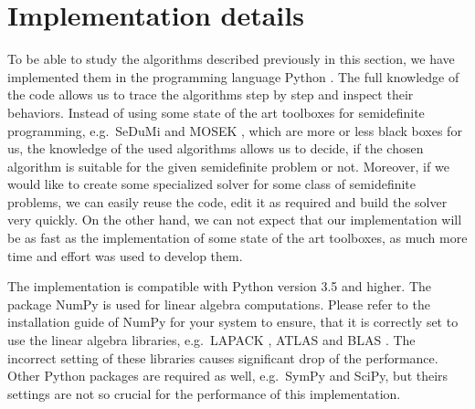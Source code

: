 \section{Implementation details}
To be able to study the algorithms described previously in this section, we have implemented them in the programming language Python \cite{python}.
The full knowledge of the code allows us to trace the algorithms step by step and inspect their behaviors.
Instead of using some state of the art toolboxes for semidefinite programming, e.g.\ SeDuMi \cite{sedumi} and MOSEK \cite{mosek}, which are more or less black boxes for us, the knowledge of the used algorithms allows us to decide, if the chosen algorithm is suitable for the given semidefinite problem or not.
Moreover, if we would like to create some specialized solver for some class of semidefinite problems, we can easily reuse the code, edit it as required and build the solver very quickly.
On the other hand, we can not expect that our implementation will be as fast as the implementation of some state of the art toolboxes, as much more time and effort was used to develop them.

The implementation is compatible with Python version 3.5 and higher.
The package NumPy is used for linear algebra computations.
Please refer to the installation guide of NumPy for your system to ensure, that it is correctly set to use the linear algebra libraries, e.g.\ LAPACK \cite{lapack}, ATLAS \cite{atlas} and BLAS \cite{blas}.
The incorrect setting of these libraries causes significant drop of the performance.
Other Python packages are required as well, e.g.\ SymPy and SciPy, but theirs settings are not so crucial for the performance of this implementation.


